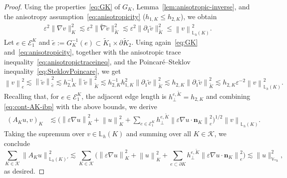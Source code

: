 \documentclass[a4paper,twoside,10pt]{article}
\newcommand{\Vsh}{V_{\!\star \hspace*{-0.2mm}h}}
\newcommand{\LKh}{\mathbb{L}_h(K)}
\newcommand{\eps}{\varepsilon}
\newcommand{\inner}[1]{( #1 )}
\newcommand*{\norm}[1]{\left\|#1\right\|}
\newcommand{\calE}{\mathcal{E}}
\newcommand{\calK}{\mathcal{K}}
\newcommand{\bn}{\mathbf{n}}
\numberwithin{equation}{section}
\renewcommand{\Vsh}{\mathbb{V}_{*h}}
\newcommand{\Kt}{\widetilde{K}}
\newcommand{\hKot}{h_{1,K}}
\newcommand{\hKtt}{h_{2,K}}
\begin{document}
\begin{proof}
	Using the properties~\eqref{eq:GK} of $G_K$, Lemma~\ref{lem:anisotropic-inverse}, and the anisotropy assumption~\eqref{eq:anisotropicity} ($\hKot\le \hKtt$), we obtain
	\begin{align*}
	\eps^2 \|\nabla v\|_{K}^2
	\lesssim
	\eps^2 \|\widetilde\nabla \widetilde v\|_{\Kt}^2
	\lesssim
	\eps^2 \|\partial_1 \widetilde v\|_{\Kt}^2
	\le
	\norm{v}_{\LKh}^2.
	\end{align*}
	Let $e\in\calE^K_1$ and $\widetilde e:=G_K^{-1}(e)\subset \Kt_1\times \partial \Kt_2$.
	Using again~\eqref{eq:GK} and~\eqref{eq:anisotropicity}, together with the anisotropic trace inequality~\eqref{eq:anisotropictraceineq}, and the Poincar\'e--Steklov  inequality~\eqref{eq:SteklovPoincare}, we get
	\begin{equation*}
	\norm{v}_{e}^2
	\lesssim
	\norm{\widetilde v}_{\widetilde e}^2
	\lesssim
	\hKtt^{-1}\norm{\widetilde v}_{\Kt}^2
	\lesssim
	\hKtt^{-1}\hKot^2 \norm{\partial_1 \widetilde v}_{\Kt}^2
	\lesssim
	\hKtt \norm{\partial_1 \widetilde v}_{\Kt}^2
	\lesssim
	\hKtt\eps^{-2}\norm{v}_{\LKh}^2.
	\end{equation*}
	Recalling that, for $e\in\calE^K_1$, the adjacent edge length is $ h_\perp^{e,\Kt}=\hKtt$ and combining  \eqref{eq:cont-AK-ibp} with the above bounds, we derive
	\begin{align*}
	\inner{A_Ku,v}_{K}
	&\lesssim
	\Big(
	\norm{\eps\nabla u}_{K}^2
	+
	\norm{u}_{K}^2
	+
	\sum_{e\in\calE^K_1}
	h_\perp^{e,\Kt}\norm{\eps\nabla u\cdot \bn_K}_{e}^2
	\Big)^{1/2}
	\norm{v}_{\LKh}.
	\end{align*}
	Taking the supremum over $v\in\LKh$ and summing over all $K\in\calK$, we conclude
	\begin{equation*}
	\sum_{K\in\calK}\norm{A_Ku}_{\LKh'}^2
	\lesssim
	\sum_{K\in\calK}
	\Big(
	\norm{\eps\nabla u}_{K}^2
	+
	\norm{u}_{K}^2
	+
	\sum_{e\subset \partial K}
	h_\perp^{e,\Kt}\norm{\eps\nabla u\cdot \bn_K}_{e}^2
	\Big)
	\lesssim
	 \|u\|_{\Vsh}^2,
	\end{equation*}
    as desired.
	\end{proof}
	
\end{document}
